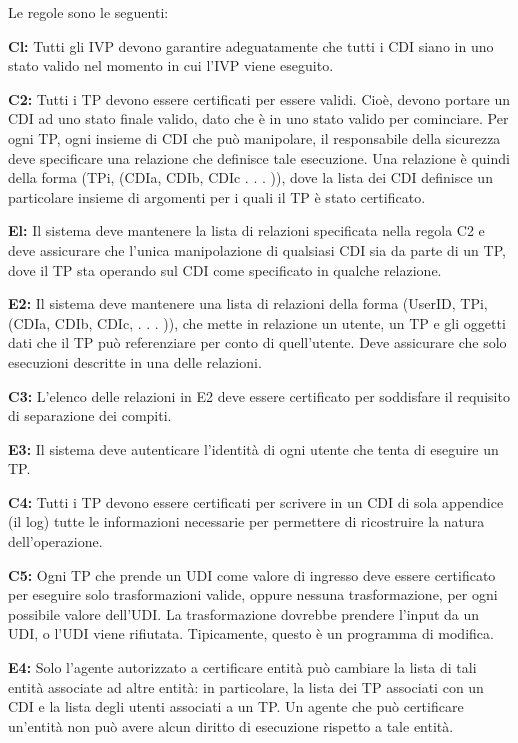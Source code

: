 \newpage
Le regole sono le seguenti:
\begin{center}
    \textbf{Cl:} Tutti gli IVP devono garantire adeguatamente che tutti i CDI siano in uno stato valido nel momento in cui l'IVP viene eseguito.
    
    \singlespacing

    \textbf{C2:} Tutti i TP devono essere certificati per essere validi. Cioè, devono portare un CDI ad uno stato finale valido, dato che è in uno stato valido per cominciare. Per ogni TP,  ogni insieme di CDI che può manipolare, il responsabile della sicurezza deve specificare una relazione che definisce tale esecuzione. Una relazione è quindi della forma (TPi, (CDIa, CDIb, CDIc . . . )), dove la lista dei CDI definisce un particolare insieme di argomenti per i quali il TP è stato certificato.
    
    \singlespacing

    \textbf{El:} Il sistema deve mantenere la lista di relazioni specificata nella regola C2 e deve assicurare che l'unica manipolazione di qualsiasi CDI sia da parte di un TP, dove il TP sta operando sul CDI come specificato in qualche relazione.
    
    \singlespacing

    \textbf{E2:} Il sistema deve mantenere una lista di relazioni della forma (UserID, TPi,(CDIa, CDIb, CDIc, . . . )), che mette in relazione un utente, un TP e gli oggetti dati che il TP può referenziare per conto di quell'utente. Deve assicurare che solo esecuzioni descritte in una delle relazioni.
    
    \singlespacing

    \textbf{C3:} L'elenco delle relazioni in E2 deve essere certificato per soddisfare il requisito di separazione dei compiti.
    
    \singlespacing
    
    \textbf{E3:} Il sistema deve autenticare l'identità di ogni utente che tenta di eseguire un TP.
    
    \singlespacing
    
    \textbf{C4:} Tutti i TP devono essere certificati per scrivere in un CDI di sola appendice (il log) tutte le informazioni necessarie per permettere di ricostruire la natura dell'operazione.
    
    \singlespacing
    
    \textbf{C5:} Ogni TP che prende un UDI come valore di ingresso deve essere certificato per eseguire solo trasformazioni valide, oppure nessuna trasformazione, per ogni possibile valore dell'UDI. La trasformazione dovrebbe prendere l'input da un UDI, o l'UDI viene rifiutata. Tipicamente, questo è un programma di modifica.
    
    \singlespacing
    
    \textbf{E4:} Solo l'agente autorizzato a certificare entità può cambiare la lista di tali entità associate ad altre entità: in particolare, la lista dei TP  associati con un CDI e la lista degli utenti associati a un TP. Un agente che può certificare un'entità non può avere alcun diritto di esecuzione rispetto a tale entità.
\end{center}

